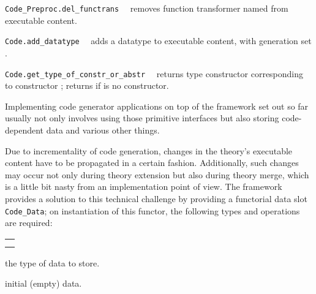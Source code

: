 \begin{isabellebody}
\begin{isamarkuptext}
\begin{description}
  \item \verb|Code_Preproc.del_functrans|~~ removes
     function transformer named  from executable content.

  \item \verb|Code.add_datatype|~~ adds
     a datatype to executable content, with generation
     set .

  \item \verb|Code.get_type_of_constr_or_abstr|~~
     returns type constructor corresponding to
     constructor ; returns 
     if  is no constructor.

  \end{description}%
\end{isamarkuptext}%
\isamarkuptrue%
%
\endisatagmlref
{\isafoldmlref}%
%
\isadelimmlref
%
\endisadelimmlref
%
\isamarkuptrue%
%
\begin{isamarkuptext}%
Implementing code generator applications on top
  of the framework set out so far usually not only
  involves using those primitive interfaces
  but also storing code-dependent data and various
  other things.

  Due to incrementality of code generation, changes in the
  theory's executable content have to be propagated in a
  certain fashion.  Additionally, such changes may occur
  not only during theory extension but also during theory
  merge, which is a little bit nasty from an implementation
  point of view.  The framework provides a solution
  to this technical challenge by providing a functorial
  data slot \verb|Code_Data|; on instantiation
  of this functor, the following types and operations
  are required:

  \medskip
  \begin{tabular}{l}
  \isa{type\ T} \\
  \isa{val\ empty{\isacharcolon}\ T} \\
  \end{tabular}

  \begin{description}

  \item {} the type of data to store.

  \item {} initial (empty) data.

  \end{description}


\end{isamarkuptext}
\end{isabellebody}
